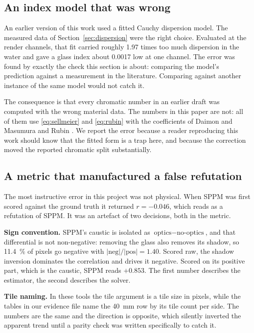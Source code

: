 \subsection{An index model that was wrong}
\label{sec:verify-index}

An earlier version of this work used a fitted Cauchy dispersion model. The measured data of Section~\ref{sec:dispersion} were the right choice. Evaluated at the render
channels, that fit carried roughly \num{1.97} times too much dispersion in the
water and gave a glass index about \num{0.0017} low at one channel. The error
was found by exactly the check this section is about: comparing the model's prediction against a measurement in the literature. Comparing against another instance of the same model would not catch it.

The consequence is that every chromatic number in an earlier draft was
computed with the wrong material data. The numbers in this paper are not: all
of them use \eqref{eq:sellmeier} and \eqref{eq:rubin} with the coefficients of
Daimon and Masumura \cite{daimon2007} and Rubin \cite{rubin1985}. We report the
error because a reader reproducing this work should know that the fitted form is
a trap here, and because the correction moved the reported chromatic split substantially.

\subsection{A metric that manufactured a false refutation}
\label{sec:verify-metric}

The most instructive error in this project was not physical. When SPPM was first
scored against the ground truth it returned $r = -0.046$, which reads as a
refutation of SPPM. It was an artefact of two decisions, both in the metric.

\textbf{Sign convention.} SPPM's caustic is isolated as
$\text{optics} - \text{no-optics}$, and that differential is not non-negative:
removing the glass also removes its shadow, so \SI{11.4}{\percent} of pixels go
negative with $|\text{neg}|/|\text{pos}| = 1.40$. Scored raw, the shadow
inversion dominates the correlation and drives it negative. Scored on its
positive part, which is the caustic, SPPM reads $+0.853$. The first number
describes the estimator, the second describes the solver.

\textbf{Tile naming.} In these tools the tile argument is a tile size in
pixels, while the tables in our evidence file name the \SI{40}{\milli\meter} row
by its tile count per side. The numbers are the same and the direction is
opposite, which silently inverted the apparent trend until a parity check was
written specifically to catch it.

